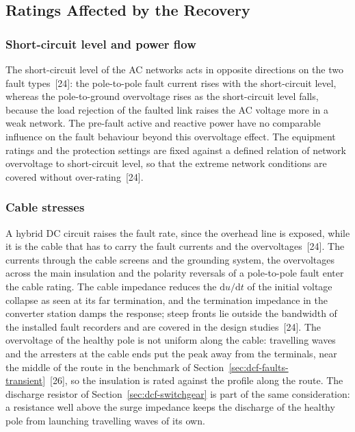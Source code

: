 \subsection{Ratings Affected by the Recovery}
\label{sec:dcf-ratings}

\subsubsection{Short-circuit level and power flow}
\label{sec:dcf-ratings-scl}

The short-circuit level of the AC networks acts in opposite directions on
the two fault types~[24]: the pole-to-pole fault current rises with the
short-circuit level, whereas the pole-to-ground overvoltage rises as the
short-circuit level falls, because the load rejection of the faulted link
raises the AC voltage more in a weak network. The pre-fault active and
reactive power have no comparable influence on the fault behaviour beyond
this overvoltage effect. The equipment ratings and the protection settings
are fixed against a defined relation of network overvoltage to
short-circuit level, so that the extreme network conditions are covered
without over-rating~[24].

\subsubsection{Cable stresses}
\label{sec:dcf-ratings-cable}

A hybrid DC circuit raises the fault rate, since the overhead line is
exposed, while it is the cable that has to carry the fault currents and the
overvoltages~[24]. The currents through the cable screens and the grounding
system, the overvoltages across the main insulation and the polarity
reversals of a pole-to-pole fault enter the cable rating. The cable
impedance reduces the $\mathrm{d}u/\mathrm{d}t$ of the initial voltage
collapse as seen at its far termination, and the termination impedance in
the converter station damps the response; steep fronts lie outside the
bandwidth of the installed fault recorders and are covered in the design
studies~[24]. The overvoltage of the healthy pole is not uniform along the
cable: travelling waves and the arresters at the cable ends put the peak
away from the terminals, near the middle of the route in the benchmark of
Section~\ref{sec:dcf-faults-transient}~[26], so the insulation is rated
against the profile along the route. The discharge resistor of Section~\ref{sec:dcf-switchgear}
is part of the same consideration: a resistance well above the surge
impedance keeps the discharge of the healthy pole from launching travelling
waves of its own.

